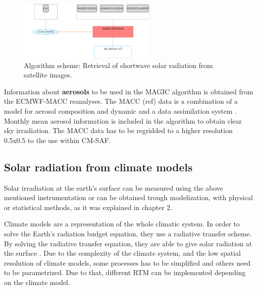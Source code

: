 \begin{figure}
  \centering
  \includegraphics[width=0.6\textwidth]{figs/esquemasat.pdf}
  \caption{Algorithm scheme: Retrieval of shortwave solar radiation from satellite images.}
 \label{fig:algorithm}
\end{figure}

Information about \textbf{aerosols} to be used in the MAGIC algorithm is obtained from the ECMWF-MACC reanalyses. The MACC (ref) data is a combination of a model for aerosol composition and dynamic \cite*{Morcrette2009} and a data assimilation system \cite*{Benedetti2009}. Monthly mean aerosol information is included in the algorithm to obtain clear sky irradiation. The MACC data has to be regridded to a higher resolution 0.5x0.5 to the use within CM-SAF.


\subsection{Solar radiation from climate models}%


Solar irradiation at the earth's surface can be measured using the above mentioned instrumentation or can be obtained trough modelization, with physical or statistical methods, as it was explained in chapter 2.

Climate models are a representation of the whole climatic system. In order to solve the Earth's radiation budget equation, they use a radiative transfer scheme. By solving the radiative transfer equation, they are able to give solar radiation at the surface . Due to the complexity of the climate system, and the low spatial resolution of climate models, some processes has to be simplified and others need to be parametrized. Due to that, different RTM can be implemented depending on the climate model.


